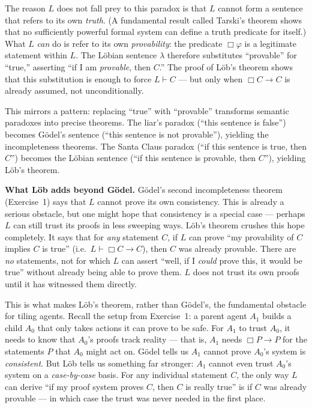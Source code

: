 \documentclass[8pt]{article}
\begin{document}
\medskip
\noindent
The reason $L$ does not fall prey to this paradox is that $L$ cannot form a sentence
that refers to its own \emph{truth}. (A fundamental result called Tarski's theorem
shows that no sufficiently powerful formal system can define a truth predicate for
itself.) What $L$ \emph{can} do is refer to its own \emph{provability}: the predicate
$\Box\varphi$ is a legitimate statement within $L$. The L\"obian sentence $\lambda$
therefore substitutes ``provable'' for ``true,'' asserting ``if I am \emph{provable},
then $C$.'' The proof of L\"ob's theorem shows that this substitution is enough to
force $L \vdash C$ --- but only when $\Box C \to C$ is already assumed, not
unconditionally.

\medskip
\noindent
This mirrors a pattern: replacing ``true'' with ``provable'' transforms semantic
paradoxes into precise theorems. The liar's paradox (``this sentence is false'')
becomes G\"odel's sentence (``this sentence is not provable''), yielding the
incompleteness theorems. The Santa Claus paradox (``if this sentence is true, then
$C$'') becomes the L\"obian sentence (``if this sentence is provable, then $C$''),
yielding L\"ob's theorem.

\medskip
\noindent
\textbf{What L\"ob adds beyond G\"odel.} G\"odel's second incompleteness theorem
(Exercise~1) says that $L$ cannot prove its own consistency. This is already a
serious obstacle, but one might hope that consistency is a special case --- perhaps
$L$ can still trust its proofs in less sweeping ways. L\"ob's theorem crushes this
hope completely. It says that for \emph{any} statement $C$, if $L$ can prove ``my
provability of $C$ implies $C$ is true'' (i.e.\ $L \vdash \Box C \to C$), then $C$
was already provable. There are \emph{no} statements, not for which $L$ can assert ``well, if I \emph{could} prove this, it would be
true'' without already being able to prove them. $L$ does not trust its own proofs
until it has witnessed them directly.

\medskip
\noindent
This is what makes L\"ob's theorem, rather than G\"odel's, the fundamental obstacle
for tiling agents. Recall the setup from Exercise~1: a parent agent $A_1$ builds a
child $A_0$ that only takes actions it can prove to be safe. For $A_1$ to trust
$A_0$, it needs to know that $A_0$'s proofs track reality --- that is, $A_1$ needs
$\Box P \to P$ for the statements $P$ that $A_0$ might act on. G\"odel tells us
$A_1$ cannot prove $A_0$'s system is \emph{consistent}. But L\"ob tells us something
far stronger: $A_1$ cannot even trust $A_0$'s system on a \emph{case-by-case} basis.
For any individual statement $C$, the only way $L$ can derive ``if my proof system
proves $C$, then $C$ is really true'' is if $C$ was already provable --- in which
case the trust was never needed in the first place.
\end{document}
